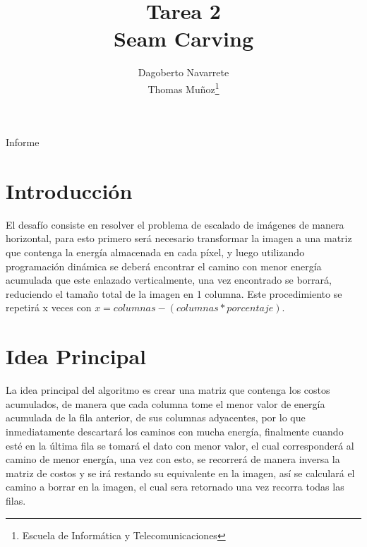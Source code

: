 \documentclass[twocolumn,11pts]{IEEEtran}
\begin{document}
\title{Tarea 2\\ Seam Carving}


\author{Dagoberto Navarrete\\Thomas Muñoz\thanks{Escuela de Informática y Telecomunicaciones}%
}

{Informe}
\maketitle
\section{Introducción}
El desafío consiste en resolver el problema de escalado de imágenes de manera horizontal, para esto primero será necesario transformar la imagen a una matriz que contenga la energía almacenada en cada píxel, y luego utilizando programación dinámica se deberá encontrar el camino con menor energía acumulada que este enlazado verticalmente, una vez encontrado se borrará, reduciendo el tamaño total de la imagen en 1 columna. Este procedimiento se repetirá x veces con  $x = columnas - (columnas*porcentaje)$.

\section{Idea Principal}
La idea principal del algoritmo es crear una matriz que contenga los costos acumulados, de manera que cada columna tome el menor valor de energía acumulada de la fila anterior, de sus columnas adyacentes, por lo que inmediatamente descartará los caminos con mucha energía, finalmente cuando esté en la última fila se tomará el dato con menor valor, el cual corresponderá  al camino de menor energía, una vez con esto, se recorrerá de manera inversa la matriz de costos y se irá restando su equivalente en la imagen, así se calculará el camino a borrar en la imagen, el cual sera retornado una vez recorra todas las filas. %
\end{document}
